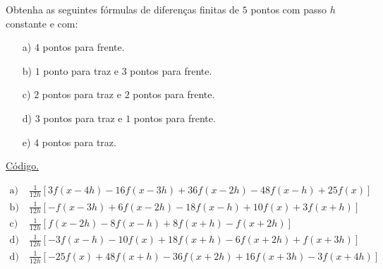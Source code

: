 \begin{exer}\label{exer:df_5pts_pi}
  Obtenha as seguintes fórmulas de diferenças finitas de $5$ pontos com passo $h$ constante e com:
  \begin{enumerate}
  \item[a)] $4$ pontos para frente.
  \item[b)] $1$ ponto para traz e $3$ pontos para frente.
  \item[c)] $2$ pontos para traz e $2$ pontos para frente.
  \item[d)] $3$ pontos para traz e $1$ pontos para frente.
  \item[e)] $4$ pontos para traz.
  \end{enumerate}
\end{exer}
\begin{resp}
  \ifisoctave 
  \href{https://github.com/phkonzen/notas/blob/master/src/MatematicaNumerica/cap_deriv/dados/exer_df_5pts_pi/exer_df_5pts_pi.m}{Código.} 
  \fi
  \begin{tiny}
    \begin{align*}
      \text{a)}&~\frac{1}{12 h} \left[3 f{\left (x- 4h \right )} - 16 f{\left (x- 3 h \right )} + 36 f{\left (x- 2 h \right )} - 48 f{\left (x- h \right ) + 25 f{\left (x \right )}}\right]\\
      \text{b)}&~\frac{1}{12 h} \left[- f{\left (x- 3 h \right )} + 6 f{\left ( x- 2 h \right )} - 18 f{\left (x- h \right )} + 10 f{\left (x \right )} + 3 f{\left (x+h \right )}\right]\\
      \text{c)}&~\frac{1}{12h} \left[f{\left (x - 2 h\right )} - 8 f{\left(x - h \right )} + 8 f{\left (x + h \right )} - f{\left (x + 2 h \right )}\right]\\
      \text{d)}&~\frac{1}{12 h} \left[- 3 f{\left ( x-h \right )} - 10 f{\left (x \right )} + 18 f{\left (x+h \right )} - 6 f{\left (x+2 h \right )} + f{\left ( x+3 h \right )}\right]\\
      \text{d)}&~\frac{1}{12 h} \left[- 25 f{\left (x \right )} + 48 f{\left ( x+h \right )} - 36 f{\left ( x+2 h \right )} + 16 f{\left ( x+3 h \right )} - 3 f{\left ( x+4 h \right )}\right]
    \end{align*}
  \end{tiny}
\end{resp}


